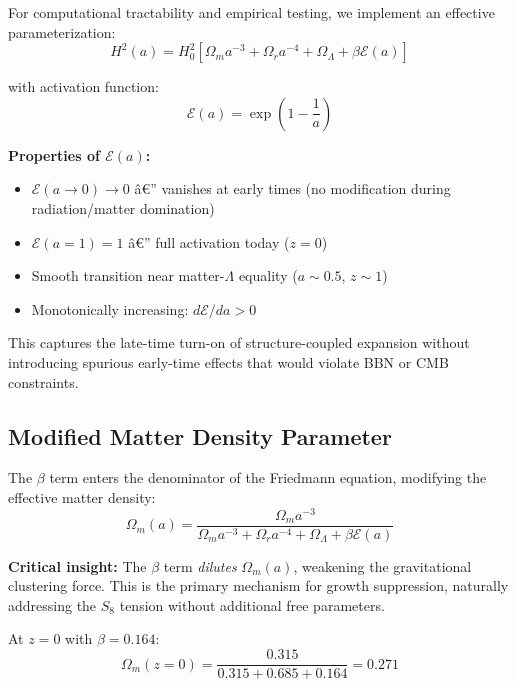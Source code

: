 \documentclass[twocolumn,superscriptaddress,prl,amsmath,amssymb]{revtex4-2}
\begin{document}
For computational tractability and empirical testing, we implement an effective parameterization:
\begin{equation}
H^2(a) = H_0^2[\Omega_m a^{-3} + \Omega_r a^{-4} + \Omega_\Lambda + \beta \mathcal{E}(a)]
\label{eq:H_eff}
\end{equation}

with activation function:
\begin{equation}
\mathcal{E}(a) = \exp\left(1 - \frac{1}{a}\right)
\label{eq:activation}
\end{equation}

\textbf{Properties of $\mathcal{E}(a)$:}
\begin{itemize}
\item $\mathcal{E}(a \to 0) \to 0$ â€” vanishes at early times (no modification during radiation/matter domination)
\item $\mathcal{E}(a = 1) = 1$ â€” full activation today ($z=0$)
\item Smooth transition near matter-$\Lambda$ equality ($a \sim 0.5$, $z \sim 1$)
\item Monotonically increasing: $d\mathcal{E}/da > 0$
\end{itemize}

This captures the late-time turn-on of structure-coupled expansion without introducing spurious early-time effects that would violate BBN or CMB constraints.

\subsection{Modified Matter Density Parameter}

The $\beta$ term enters the denominator of the Friedmann equation, modifying the effective matter density:
\begin{equation}
\Omega_m(a) = \frac{\Omega_m a^{-3}}{\Omega_m a^{-3} + \Omega_r a^{-4} + \Omega_\Lambda + \beta \mathcal{E}(a)}
\label{eq:Omega_m_modified}
\end{equation}

\textbf{Critical insight:} The $\beta$ term \textit{dilutes} $\Omega_m(a)$, weakening the gravitational clustering force. This is the primary mechanism for growth suppression, naturally addressing the $S_8$ tension without additional free parameters.

At $z=0$ with $\beta = 0.164$:
\begin{equation}
\Omega_m(z=0) = \frac{0.315}{0.315 + 0.685 + 0.164} = 0.271
\end{equation}
\end{document}
